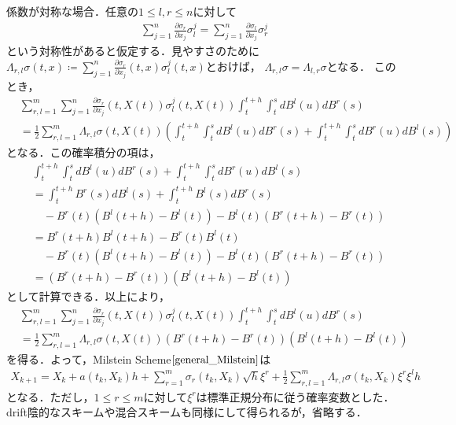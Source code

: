 \documentclass[dvipdfmx,autodetect-engine]{jsarticle}
\theoremstyle{remark}
\theoremstyle{definition}
\begin{document}
係数が対称な場合．任意の$1\leq l,r\leq n$に対して
\begin{align}
    \sum_{j=1}^{n} \frac{\partial \sigma_{r}}{\partial x_{j}} \sigma_{l}^{j}
    = \sum_{j=1}^{n} \frac{\partial \sigma_{l}}{\partial x_{j}} \sigma_{r}^{j}
\end{align}
という対称性があると仮定する．見やすさのために
$\Lambda_{r,l}\sigma (t,x) \coloneqq \sum_{j=1}^{n} 
\frac{\partial \sigma_{r}}{\partial x_{j}} (t,x) \sigma_{l}^{j}(t,x)$とおけば，
$\Lambda_{r,l}\sigma = \Lambda_{l,r}\sigma$となる．
このとき，
\begin{align}
    & \sum_{r,l=1}^{m} \sum_{j=1}^{n} 
        \frac{\partial \sigma_{r}}{\partial x_{j}}(t,X(t)) \sigma_{l}^{j}(t,X(t)) 
        \int_{t}^{t+h} \int_{t}^{s} dB^{l}(u) dB^{r}(s)\\
    &= \frac{1}{2} \sum_{r,l=1}^{m} \Lambda_{r,l}\sigma(t,X(t))
    \left(\int_{t}^{t+h} \int_{t}^{s} dB^{l}(u) dB^{r}(s) + 
    \int_{t}^{t+h} \int_{t}^{s} dB^{r}(u) dB^{l}(s)\right)
\end{align}
となる．この確率積分の項は，
\begin{align}
    &\int_{t}^{t+h} \int_{t}^{s} dB^{l}(u) dB^{r}(s) + 
    \int_{t}^{t+h} \int_{t}^{s} dB^{r}(u) dB^{l}(s) \\
    &= \int_{t}^{t+h} B^{r}(s) dB^{l}(s) + \int_{t}^{t+h} B^{l}(s) dB^{r}(s)\\
    &\quad - B^{r}(t)(B^{l}(t+h)-B^{l}(t)) - B^{l}(t)(B^{r}(t+h)-B^{r}(t))\\
    &= B^{r}(t+h)B^{l}(t+h) - B^{r}(t)B^{l}(t) \\
    &\quad - B^{r}(t)(B^{l}(t+h)-B^{l}(t)) - B^{l}(t)(B^{r}(t+h)-B^{r}(t))\\
    &= (B^{r}(t+h)-B^{r}(t)) (B^{l}(t+h)-B^{l}(t))
\end{align}
として計算できる．以上により，
\begin{align}
    &\sum_{r,l=1}^{m} \sum_{j=1}^{n} 
        \frac{\partial \sigma_{r}}{\partial x_{j}}(t,X(t)) \sigma_{l}^{j}(t,X(t)) 
        \int_{t}^{t+h} \int_{t}^{s} dB^{l}(u) dB^{r}(s) \\
    &= \frac{1}{2} \sum_{r,l=1}^{m} \Lambda_{r,l}\sigma(t,X(t))
    (B^{r}(t+h)-B^{r}(t)) (B^{l}(t+h)-B^{l}(t))
\end{align}
を得る．よって，Milstein Scheme$\eqref{general_Milstein}$は
\begin{align}
    X_{k+1} = X_{k} + a(t_{k},X_{k})h 
    + \sum_{r=1}^{m} \sigma_{r}(t_{k},X_{k})\sqrt{h}\xi^{r}
     + \frac{1}{2} \sum_{r,l=1}^{m} \Lambda_{r,l}\sigma(t_{k},X_{k})
    \xi^{r} \xi^{l} h
\end{align}
となる．ただし，$1\leq r\leq m$に対して$\xi^{r}$は標準正規分布に従う確率変数とした．
drift陰的なスキームや混合スキームも同様にして得られるが，省略する．
\end{document}
